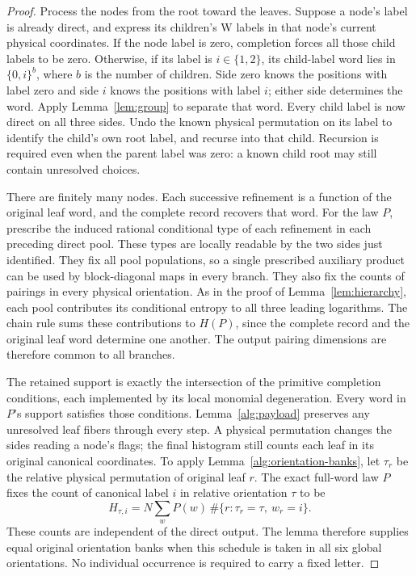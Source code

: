 \begin{proof}
Process the nodes from the root toward the leaves.  Suppose a node's label
is already direct, and express its children's W labels in that node's
current physical coordinates.  If the node label is zero, completion
forces all those child labels to be zero.  Otherwise, if its label is
\(i\in\{1,2\}\), its child-label word lies in \(\{0,i\}^b\), where
\(b\) is the number of children.  Side zero knows the positions with label
zero and side \(i\) knows the positions with label \(i\); either side
determines the word.  Apply Lemma~\ref{lem:group} to separate that word.
Every child label is now direct on all three sides.  Undo the known
physical permutation on its label to identify the child's own root label,
and recurse into that child.  Recursion is required even when the parent
label was zero: a known child root may still contain unresolved choices.

There are finitely many nodes.  Each successive refinement is a function
of the original leaf word, and the complete record recovers that word.
For the law \(P\), prescribe the induced rational conditional type of
each refinement in each preceding direct pool.  These types are locally
readable by the two sides just identified.  They fix all pool populations,
so a single prescribed auxiliary product can be used by block-diagonal
maps in every branch.  They also fix the counts of pairings in every
physical orientation.  As in the proof of Lemma~\ref{lem:hierarchy}, each
pool contributes its conditional entropy to all three leading logarithms.
The chain rule sums these contributions to \(H(P)\), since the complete
record and the original leaf word determine one another.  The output
pairing dimensions are therefore common to all branches.

The retained support is exactly the intersection of the primitive
completion conditions, each implemented by its local monomial
degeneration.  Every word in \(P\)'s support satisfies those conditions.
Lemma~\ref{alg:payload} preserves any unresolved leaf fibers through every
step.  A physical permutation changes the sides reading a node's flags;
the final histogram still counts each leaf in its original canonical
coordinates.  To apply Lemma~\ref{alg:orientation-banks}, let \(\tau_r\)
be the relative physical permutation of original leaf \(r\).  The exact
full-word law \(P\) fixes the count of canonical label \(i\) in relative
orientation \(\tau\) to be
\[
 H_{\tau,i}
 =N\sum_w P(w)\,
       \#\{r:\tau_r=\tau,\ w_r=i\}.
\]
These counts are independent of the direct output.  The lemma therefore
supplies equal original orientation banks when this schedule is taken in
all six global orientations.  No individual occurrence is required to carry
a fixed letter.
\end{proof}

